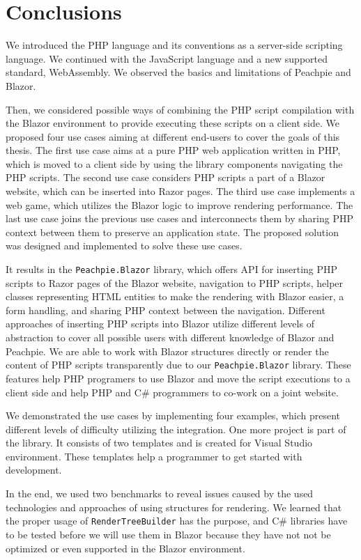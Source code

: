 \chapter{Conclusions}

We introduced the PHP language and its conventions as a server-side scripting language.
We continued with the JavaScript language and a new supported standard, WebAssembly.
We observed the basics and limitations of Peachpie and Blazor.
\par
Then, we considered possible ways of combining the PHP script compilation with the Blazor environment to provide executing these scripts on a client side.
We proposed four use cases aiming at different end-users to cover the goals of this thesis.
The first use case aims at a pure PHP web application written in PHP, which is moved to a client side by using the library components navigating the PHP scripts.
The second use case considers PHP scripts a part of a Blazor website, which can be inserted into Razor pages.
The third use case implements a web game, which utilizes the Blazor logic to improve rendering performance.
The last use case joins the previous use cases and interconnects them by sharing PHP context between them to preserve an application state.  
The proposed solution was designed and implemented to solve these use cases.
\par
It results in the \texttt{Peachpie.Blazor} library, which offers API for inserting PHP scripts to Razor pages of the Blazor website, navigation to PHP scripts, helper classes representing HTML entities to make the rendering with Blazor easier, a form handling, and sharing PHP context between the navigation.
Different approaches of inserting PHP scripts into Blazor utilize different levels of abstraction to cover all possible users with different knowledge of Blazor and Peachpie.
We are able to work with Blazor structures directly or render the content of PHP scripts transparently due to our \texttt{Peachpie.Blazor} library.
These features help PHP programers to use Blazor and move the script executions to a client side and help PHP and C\# programmers to co-work on a joint website.
\par
We demonstrated the use cases by implementing four examples, which present different levels of difficulty utilizing the integration.
One more project is part of the library. It consists of two templates and is created for Visual Studio environment.
These templates help a programmer to get started with development.
\par
In the end, we used two benchmarks to reveal issues caused by the used technologies and approaches of using structures for rendering.
We learned that the proper usage of \texttt{RenderTreeBuilder} has the purpose, and C\# libraries have to be tested before we will use them in Blazor because they have not not be optimized or even supported in the Blazor environment.

